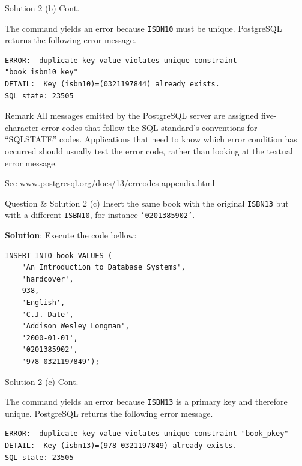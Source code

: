 \begin{frame}[fragile]{Solution 2 (b) Cont.}

The command yields an error  because \texttt{ISBN10} must be unique. PostgreSQL returns the following error message.

\begin{lstlisting}[style=error]
ERROR:  duplicate key value violates unique constraint "book_isbn10_key"
DETAIL:  Key (isbn10)=(0321197844) already exists.
SQL state: 23505
\end{lstlisting}

\begin{block}{Remark} 
All messages emitted by the PostgreSQL server are assigned five-character error codes that follow the SQL standard's conventions for ``SQLSTATE'' codes. Applications that need to know which error condition has occurred should usually test the error code, rather than looking at the textual error message. \vspace{10pt}

See \url{www.postgresql.org/docs/13/errcodes-appendix.html}
\end{block}
\end{frame}

\begin{frame}[fragile]{Question \& Solution 2 (c)}
Insert the same book  with the original \texttt{ISBN13} but with a different \texttt{ISBN10}, for instance \texttt{'0201385902'}.\vspace{10pt}

\textbf{Solution}: Execute the code bellow:

\begin{lstlisting}
INSERT INTO book VALUES (
	'An Introduction to Database Systems', 
	'hardcover',
	938,
	'English',
	'C.J. Date',
	'Addison Wesley Longman',
	'2000-01-01',
	'0201385902',
	'978-0321197849');
\end{lstlisting}

\end{frame}

\begin{frame}[fragile]{Solution 2 (c) Cont.}

The command yields an error  because  \texttt{ISBN13} is a primary key and therefore unique. PostgreSQL returns the following error message.

\begin{lstlisting}[style=error]
ERROR:  duplicate key value violates unique constraint "book_pkey"
DETAIL:  Key (isbn13)=(978-0321197849) already exists.
SQL state: 23505
\end{lstlisting}
\end{frame}

